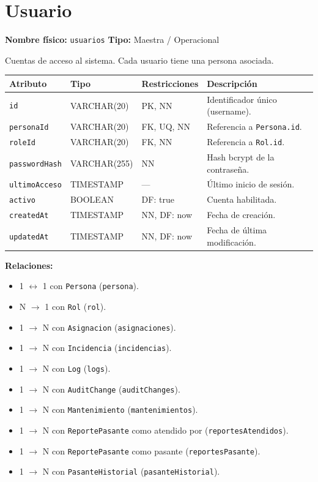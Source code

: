 \documentclass[12pt,a4paper]{article}
\newenvironment{tabladesc}[3]{%
  \section{#1}
  \textbf{Nombre físico:} \texttt{#2} \hfill \textbf{Tipo:} #3\par
  \medskip
}{%
  \bigskip
}
\begin{document}
\begin{tabladesc}{Usuario}{usuarios}{Maestra / Operacional}

Cuentas de acceso al sistema. Cada usuario tiene una persona asociada.

\bigskip
\begin{longtable}{L{3.5cm} L{2.5cm} L{2cm} L{7.5cm}}
\toprule
\textbf{Atributo} & \textbf{Tipo} & \textbf{Restricciones} & \textbf{Descripción} \\
\midrule
\endhead
\bottomrule
\endfoot
\texttt{id}          & VARCHAR(20)  & PK, NN & Identificador único (username). \\
\texttt{personaId}   & VARCHAR(20)  & FK, UQ, NN & Referencia a \texttt{Persona.id}. \\
\texttt{roleId}      & VARCHAR(20)  & FK, NN & Referencia a \texttt{Rol.id}. \\
\texttt{passwordHash}& VARCHAR(255) & NN     & Hash bcrypt de la contraseña. \\
\texttt{ultimoAcceso}& TIMESTAMP    & ---    & Último inicio de sesión. \\
\texttt{activo}      & BOOLEAN      & DF: true & Cuenta habilitada. \\
\texttt{createdAt}   & TIMESTAMP    & NN, DF: now & Fecha de creación. \\
\texttt{updatedAt}   & TIMESTAMP    & NN, DF: now & Fecha de última modificación. \\
\bottomrule
\end{longtable}

\textbf{Relaciones:}
\begin{itemize}[nosep]
  \item 1 $\leftrightarrow$ 1 con \texttt{Persona} (\texttt{persona}).
  \item N $\rightarrow$ 1 con \texttt{Rol} (\texttt{rol}).
  \item 1 $\rightarrow$ N con \texttt{Asignacion} (\texttt{asignaciones}).
  \item 1 $\rightarrow$ N con \texttt{Incidencia} (\texttt{incidencias}).
  \item 1 $\rightarrow$ N con \texttt{Log} (\texttt{logs}).
  \item 1 $\rightarrow$ N con \texttt{AuditChange} (\texttt{auditChanges}).
  \item 1 $\rightarrow$ N con \texttt{Mantenimiento} (\texttt{mantenimientos}).
  \item 1 $\rightarrow$ N con \texttt{ReportePasante} como atendido por (\texttt{reportesAtendidos}).
  \item 1 $\rightarrow$ N con \texttt{ReportePasante} como pasante (\texttt{reportesPasante}).
  \item 1 $\rightarrow$ N con \texttt{PasanteHistorial} (\texttt{pasanteHistorial}).
\end{itemize}
\end{tabladesc}
\end{document}
